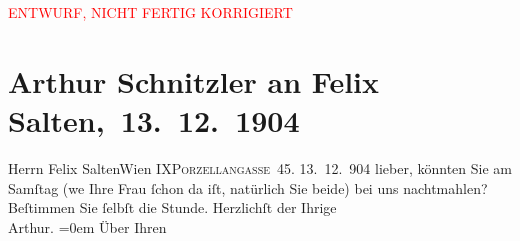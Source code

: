 
\begin{center}
            \textcolor{red}{ENTWURF, NICHT FERTIG KORRIGIERT}
                      \end{center}
            
         
         \renewcommand{\erwaehntePersonen}{Personen: Carl Hochsinger, Felix Salten, Ottilie Salten}
         \renewcommand{\erwaehnteInstitutionen}{Institutionen: Erstes öffentliches Kinderkrankeninstitut}
         \renewcommand{\erwaehnteOrte}{Orte: Carl-Theater, IX., Alsergrund, Porzellangasse, VIII., Josefstadt, Wien}
         \renewcommand{\erwaehnteWerke}{Werke: Artur Schnitzler-Abend, Die Zeit}
               \section[ Arthur Schnitzler an Felix Salten, 13. 12. 1904]{ Arthur Schnitzler an Felix Salten, 13. 12. 1904}\nopagebreak{}\rehead{ }\begin{ledgroupsized}[t]{13cm}\normalsize\beginnumbering \toendnotes[C]{\smallbreak\pagebreak[2]} 
\toendnotes[C]{\smallbreak}\pstart{}{\pb}Herrn Felix Salten\pend{}\pstart{}Wien IX\pend{}\pstart{}\textsc{Porzellangasse 45.}\pend{}{\bigskip}\pstart
           \raggedleft{}{\pb}13. 12. 904\pend
           \pstart
           lieber, könnten Sie am Samſtag (we{\geminationn} Ihre Frau ſchon da iſt, natürlich Sie beide) bei uns
               nachtmahlen? Beſtimmen Sie ſelbſt die Stunde.\pend
           \pstart
           Herzlichſt der Ihrige {\\[\baselineskip]}\spacefill\mbox{Arthur.}\pend
           \leftskip=0em{}\pstart
           \noindent{}Über Ihren \label{K_L02993-1v}
\end{ledgroupsized}
